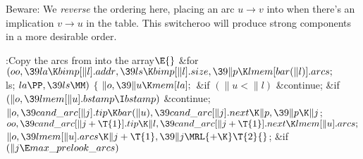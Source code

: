 Beware: We {\it reverse\/} the ordering here, placing an
arc $u\to v$ into  when there's an implication $v\to u$
in the  table. This switcheroo will produce strong components
in a more desirable order.

\Y\B\4:Copy the arcs from  into the  array\X${}%
\E{}$\6
\&{for} ${}(\\{oo},\39\\{la}\K\\{bimp}[\|l].\\{addr},\39\\{ls}\K\\{bimp}[\|l].%
\\{size},\39\|p\K\\{lmem}[\\{bar}(\|l)].\\{arcs};{}$ \\{ls}; ${}\\{la}\PP,\39%
\\{ls}\MM){}$\5
${}\{{}$\1\6
${}\|o,\39\|u\K\\{mem}[\\{la}];{}$\6
\&{if} ${}(\|u<\|l){}$\1\5
\&{continue};\2\6
\&{if} ${}(\|o,\39\\{lmem}[\|u].\\{bstamp}\I\\{bstamp}){}$\1\5
\&{continue};\2\6
${}\|o,\39\\{cand\_arc}[\|j].\\{tip}\K\\{bar}(\|u),\39\\{cand\_arc}[\|j].%
\\{next}\K\|p,\39\|p\K\|j{}$;\6
${}\\{oo},\39\\{cand\_arc}[\|j+\T{1}].\\{tip}\K\|l,\39\\{cand\_arc}[\|j+\T{1}].%
\\{next}\K\\{lmem}[\|u].\\{arcs};{}$\6
${}\|o,\39\\{lmem}[\|u].\\{arcs}\K\|j+\T{1},\39\|j\MRL{+{\K}}\T{2}{}$;\6
\&{if} ${}(\|j\E\\{max\_prelook\_arcs}){}$\5

